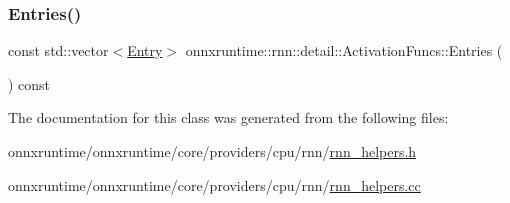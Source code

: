 \subsubsection{\texorpdfstring{Entries()}{Entries()}}
{\footnotesize\ttfamily const std\+::vector$<$\mbox{\hyperlink{structonnxruntime_1_1rnn_1_1detail_1_1ActivationFuncs_1_1Entry}{Entry}}$>$ onnxruntime\+::rnn\+::detail\+::\+Activation\+Funcs\+::\+Entries (\begin{DoxyParamCaption}{ }\end{DoxyParamCaption}) const\hspace{0.3cm}{\ttfamily [inline]}}



The documentation for this class was generated from the following files\+:\begin{DoxyCompactItemize}
\item 
onnxruntime/onnxruntime/core/providers/cpu/rnn/\mbox{\hyperlink{rnn__helpers_8h}{rnn\+\_\+helpers.\+h}}\item 
onnxruntime/onnxruntime/core/providers/cpu/rnn/\mbox{\hyperlink{rnn__helpers_8cc}{rnn\+\_\+helpers.\+cc}}\end{DoxyCompactItemize}
